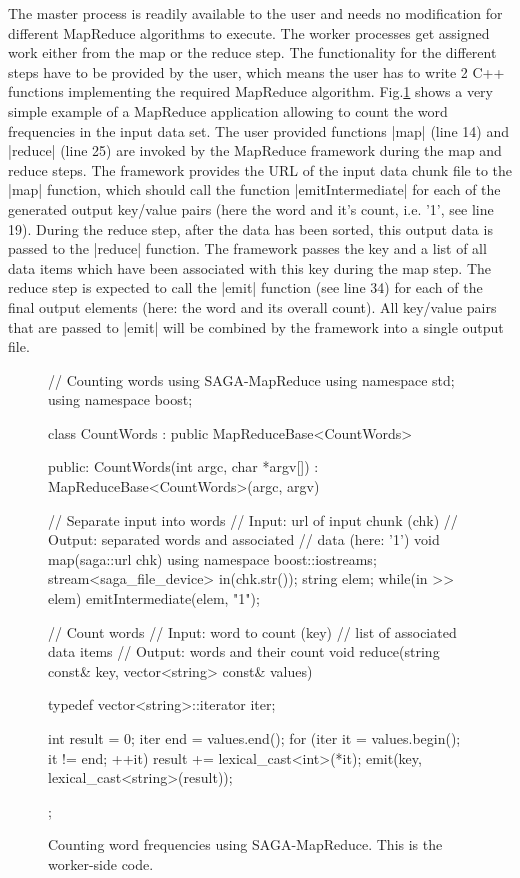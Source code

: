 \documentclass[conference,final]{IEEEtran}
\begin{document}
The master process is readily available to the user and needs no
modification for different MapReduce algorithms to execute.  The
worker processes get assigned work either from the map or the reduce
step. The functionality for the different steps have to be provided by
the user, which means the user has to write 2 C++ functions
implementing the required MapReduce algorithm.
Fig.\ref{src:saga-mapreduce} shows a very simple example of a
MapReduce application allowing to count the word frequencies in the
input data set. The user provided functions |map| (line 14) and
|reduce| (line 25) are invoked by the MapReduce framework during the
map and reduce steps. The framework provides the URL of the input data
chunk file to the |map| function, which should call the function
|emitIntermediate| for each of the generated output key/value pairs
(here the word and it's count, i.e. '1', see line 19). During the
reduce step, after the data has been sorted, this output data is
passed to the |reduce| function. The framework passes the key and a
list of all data items which have been associated with this key during
the map step. The reduce step is expected to call the |emit| function
(see line 34) for each of the final output elements (here: the word
and its overall count). All key/value pairs that are passed to |emit|
will be combined by the framework into a single output file.

\begin{figure}[!ht]
 \begin{center}
  \begin{mycode}[label=SAGA MapReduce Word Count Algorithm]
  // Counting words using SAGA-MapReduce
  using namespace std;
  using namespace boost;

  class CountWords 
    : public MapReduceBase<CountWords> {
  public:
    CountWords(int argc, char *argv[]) 
      : MapReduceBase<CountWords>(argc, argv) 
    {}

    // Separate input into words
    // Input:  url of input chunk (chk)
    // Output: separated words and associated 
    //         data (here: '1')
    void map(saga::url chk) {
      using namespace boost::iostreams;
      stream<saga_file_device> in(chk.str());
      string elem;
      while(in >> elem) 
        emitIntermediate(elem, "1");
    } 

    // Count words
    // Input:  word to count (key)
    //         list of associated data items
    // Output: words and their count
    void reduce(string const& key, 
      vector<string> const& values) {
      typedef vector<string>::iterator iter;

      int result = 0;
      iter end = values.end();
      for (iter it = values.begin(); 
           it != end; ++it) {
        result += lexical_cast<int>(*it);
      }
      emit(key, lexical_cast<string>(result));
    }
  };
  \end{mycode}
  \caption{\label{src:saga-mapreduce} Counting word frequencies using
    SAGA-MapReduce. This is the worker-side code.}
 \end{center}
\end{figure}
\end{document}
